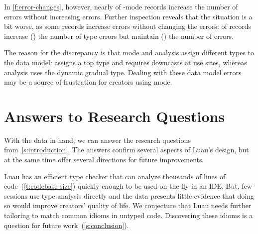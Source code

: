 \documentclass[english,submission,cleveref]{programming}
\begin{document}
In \cref{f:error-changes}, however, nearly  of \mstrict{}-mode records
increase the number of \mstrict{} errors without increasing \FS{} errors.
Further inspection reveals that the situation is a bit worse, as
some records increase \mstrict{} errors without changing the \FS{} errors:
     of \mstrict{} records increase (\addsym{}) the number of type errors
    but maintain (\keepsym{}) the number of \FS{} errors.

The reason for the discrepancy is that \mstrict{} mode and \FS{} analysis
assign different types to the data model: \mstrict{} assigns a top type
and requires downcasts at use sites, whereas \FS{} analysis uses the
dynamic gradual type.
Dealing with these data model errors may be a source of frustration
for creators using \mstrict{} mode.


\section{Answers to Research Questions}
\label{s:discussion}

With the data in hand, we can answer the research questions
from~\cref{s:introduction}.
The answers confirm several aspects of Luau's design, but
at the same time offer several directions for future improvements.

Luau has an efficient type checker that can
analyze thousands of lines of code~(\cref{t:codebase-size}) quickly
enough to be used on-the-fly in an IDE.
But, few sessions use type analysis directly and the data presents little
evidence that doing so would improve creators' quality of life.
We conjecture that Luau needs further tailoring to match
common idioms in untyped code.
Discovering these idioms is a question for future work~(\cref{s:conclusion}).
\end{document}
